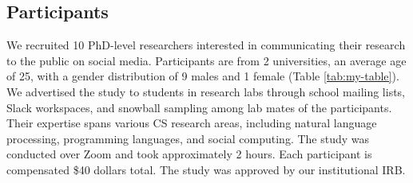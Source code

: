 

\subsection{Participants}
We recruited 10 PhD-level researchers interested in communicating their research to the public on social media. Participants are from 2 universities, an average age of 25, with a gender distribution of 9 males and 1 female (Table \ref{tab:my-table}). We advertised the study to students in research labs through school mailing lists, Slack workspaces, and snowball sampling among lab mates of the participants. Their expertise spans various CS research areas, including natural language processing, programming languages, and social computing. The study was conducted over Zoom and took approximately 2 hours. Each participant is compensated \$40 dollars total. The study was approved by our institutional IRB. 



